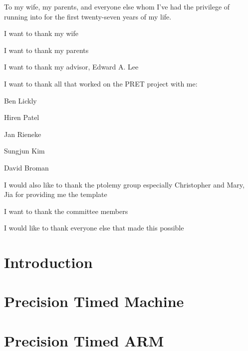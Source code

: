 \documentclass[11pt]{ucthesis}
\begin{document}
\begin{frontmatter}

\begin{dedication}
\null\vfil
{\large
\begin{center}
To my wife, my parents, and everyone else whom I've had the privilege of running into for the first twenty-seven years of my life.
\end{center}}
\vfil\null
\end{dedication}


\begin{acknowledgements}

I want to thank my wife

I want to thank my parents

I want to thank my advisor, Edward A. Lee

I want to thank all that worked on the PRET project with me: 

Ben Lickly

Hiren Patel

Jan Rieneke

Sungjun Kim

David Broman

I would also like to thank the ptolemy group especially Christopher and Mary, Jia for providing me the template

I want to thank the committee members

I would like to thank everyone else that made this possible

\end{acknowledgements}

\tableofcontents
\listoffigures
\listoftables

\end{frontmatter}

\chapter{Introduction}
\label{chapter:intro}


\chapter{Precision Timed Machine}
\label{chapter:pret}


\chapter{Precision Timed ARM}
\label{chapter:ptarm}

\end{document}
